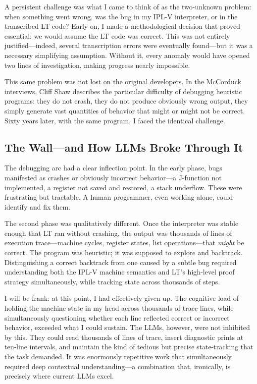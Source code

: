 \documentclass[journal]{IEEEtran}
\begin{document}
A persistent challenge was what I came to think of as the two-unknown
problem: when something went wrong, was the bug in my IPL-V
interpreter, or in the transcribed LT code? Early on, I made a
methodological decision that proved essential: we would assume the LT
code was correct. This was not entirely justified---indeed, several
transcription errors were eventually found---but it was a necessary
simplifying assumption. Without it, every anomaly would have opened
two lines of investigation, making progress nearly impossible.

This same problem was not lost on the original developers. In the
McCorduck interviews, Cliff Shaw describes the particular difficulty
of debugging heuristic programs: they do not crash, they do not
produce obviously wrong output, they simply generate vast quantities
of behavior that might or might not be correct. Sixty years later,
with the same program, I faced the identical challenge.

\subsection{The Wall---and How LLMs Broke Through It}

The debugging arc had a clear inflection point. In the early phase,
bugs manifested as crashes or obviously incorrect behavior---a
J-function not implemented, a register not saved and restored, a
stack underflow. These were frustrating but tractable. A human
programmer, even working alone, could identify and fix them.

The second phase was qualitatively different. Once the interpreter
was stable enough that LT ran without crashing, the output was
thousands of lines of execution trace---machine cycles, register
states, list operations---that \textit{might} be correct. The program
was heuristic; it was supposed to explore and backtrack. Distinguishing
a correct backtrack from one caused by a subtle bug required
understanding both the IPL-V machine semantics and LT's high-level
proof strategy simultaneously, while tracking state across thousands
of steps.

I will be frank: at this point, I had effectively given up. The
cognitive load of holding the machine state in my head across
thousands of trace lines, while simultaneously questioning whether
each line reflected correct or incorrect behavior, exceeded what I
could sustain. The LLMs, however, were not inhibited by this. They
could read thousands of lines of trace, insert diagnostic prints at
ten-line intervals, and maintain the kind of tedious but precise
state-tracking that the task demanded. It was enormously repetitive
work that simultaneously required deep contextual understanding---a
combination that, ironically, is precisely where current LLMs excel.
\end{document}
